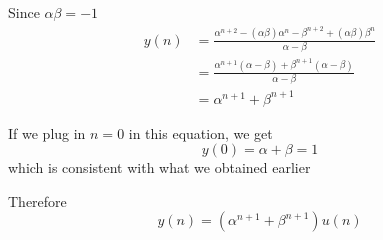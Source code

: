 \documentclass[journal,12pt,twocolumn]{IEEEtran}
\numberwithin{equation}{section}
\renewcommand\thesection{\arabic{section}}
\begin{document}
\begin{enumerate}[label=\thesection.\arabic*,ref=\thesection.\theenumi]
Since $\alpha\beta = -1$
\begin{align}
	y(n) &= \frac{\alpha^{n+2} -(\alpha\beta)\alpha^{n} - \beta^{n+2}  + (\alpha\beta)\beta^{n}}{\alpha - \beta} \\
	&= \frac{\alpha^{n+1}(\alpha - \beta) + \beta^{n+1}(\alpha - \beta)}{\alpha - \beta} \\
	&= \alpha^{n+1} + \beta^{n+1}
\end{align}

If we plug in $n=0$ in this equation, we get
\begin{equation}
	y(0) = \alpha + \beta = 1
\end{equation}
which is consistent with what we obtained earlier

Therefore
\begin{equation}
	y(n) = (\alpha^{n+1} + \beta^{n+1})u(n)
\end{equation}


\end{enumerate}
\end{document}
